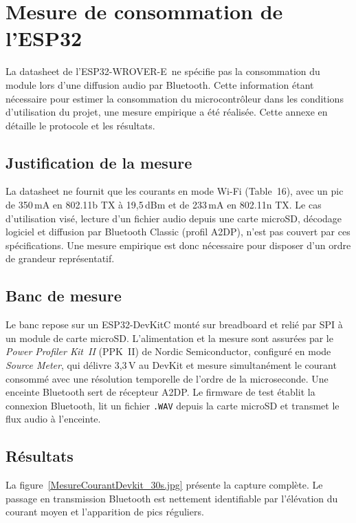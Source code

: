 \chapter{Mesure de consommation de l'ESP32}
\label{ann:conso_esp32}

La datasheet de l'ESP32-WROVER-E\,\cite{ESP32_WROVER-E_Datasheet} ne spécifie pas la consommation du module lors d'une diffusion audio par Bluetooth. Cette information étant nécessaire pour estimer la consommation du microcontrôleur dans les conditions d'utilisation du projet, une mesure empirique a été réalisée. Cette annexe en détaille le protocole et les résultats.

\section{Justification de la mesure}

La datasheet ne fournit que les courants en mode Wi-Fi (Table~16), avec un pic de 350\,mA en 802.11b TX à 19,5\,dBm et de 233\,mA en 802.11n TX. Le cas d'utilisation visé, lecture d'un fichier audio depuis une carte microSD, décodage logiciel et diffusion par Bluetooth Classic (profil A2DP), n'est pas couvert par ces spécifications. Une mesure empirique est donc nécessaire pour disposer d'un ordre de grandeur représentatif.

\section{Banc de mesure}

Le banc repose sur un ESP32-DevKitC monté sur breadboard et relié par SPI à un module de carte microSD. L'alimentation et la mesure sont assurées par le \textit{Power Profiler Kit~II} (PPK~II) de Nordic Semiconductor, configuré en mode \textit{Source Meter}, qui délivre 3,3\,V au DevKit et mesure simultanément le courant consommé avec une résolution temporelle de l'ordre de la microseconde. Une enceinte Bluetooth sert de récepteur A2DP. Le firmware de test établit la connexion Bluetooth, lit un fichier \texttt{.WAV} depuis la carte microSD et transmet le flux audio à l'enceinte.

\section{Résultats}

La figure~\ref{MesureCourantDevkit_30s.jpg} présente la capture complète. Le passage en transmission Bluetooth est nettement identifiable par l'élévation du courant moyen et l'apparition de pics réguliers.

